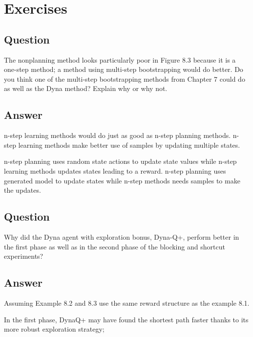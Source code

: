 \documentclass[11pt]{article}
\begin{document}
    \maketitle
    \setcounter{section}{7}


    \section{Exercises}

    \subsection{Question}

    The nonplanning method looks particularly poor in Figure 8.3 because it is a one-step method;
    a method using multi-step bootstrapping would do better.
    Do you think one of the multi-step bootstrapping methods from Chapter 7 could do as well as  the Dyna method?
    Explain why or why not.

    \subsection*{Answer}

    n-step learning methods would do just as good as n-step planning methods.
    n-step learning methods make better use of samples by updating multiple states.

    n-step planning uses random state actions to update state values while n-step learning methods updates states leading to a reward.
    n-step planning uses generated model to update states while n-step methods needs samples to make the updates.

    \subsection{Question}

    Why did the Dyna agent with exploration bonus, Dyna-Q+, perform better in the first phase as well as in the second phase of the blocking and shortcut experiments?

    \subsection*{Answer}

    Assuming Example 8.2 and 8.3 use the same reward structure as the example 8.1.

    In the first phase, DynaQ+ may have found the shortest path faster thanks to its more robust exploration strategy;
\end{document}
